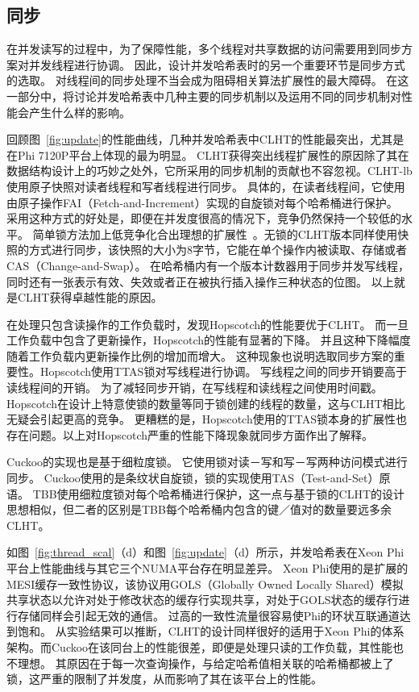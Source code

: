 \subsection{同步}
\label{sec:sync}
在并发读写的过程中，为了保障性能，多个线程对共享数据的访问需要用到同步方案对并发线程进行协调。
因此，设计并发哈希表时的另一个重要环节是同步方式的选取。
对线程间的同步处理不当会成为阻碍相关算法扩展性的最大障碍。
在这一部分中，将讨论并发哈希表中几种主要的同步机制以及运用不同的同步机制对性能会产生什么样的影响。

回顾图~\ref{fig:update}的性能曲线，几种并发哈希表中CLHT的性能最突出，尤其是在Phi 7120P平台上体现的最为明显。
CLHT获得突出线程扩展性的原因除了其在数据结构设计上的巧妙之处外，它所采用的同步机制的贡献也不容忽视。CLHT-lb使用原子快照对读者线程和写者线程进行同步。
具体的，在读者线程间，它使用由原子操作FAI（Fetch-and-Increment）实现的自旋锁对每个哈希桶进行保护。
采用这种方式的好处是，即便在并发度很高的情况下，竞争仍然保持一个较低的水平。
简单锁方法加上低竞争化合出理想的扩展性~\cite{david}。无锁的CLHT版本同样使用快照的方式进行同步，该快照的大小为8字节，它能在单个操作内被读取、存储或者CAS（Change-and-Swap）。
在哈希桶内有一个版本计数器用于同步并发写线程，同时还有一张表示有效、失效或者正在被执行插入操作三种状态的位图。
以上就是CLHT获得卓越性能的原因。

在处理只包含读操作的工作负载时，发现Hopscotch的性能要优于CLHT。
而一旦工作负载中包含了更新操作，Hopscotch的性能有显著的下降。
并且这种下降幅度随着工作负载内更新操作比例的增加而增大。
这种现象也说明选取同步方案的重要性。Hopscotch使用TTAS锁对写线程进行协调。
写线程之间的同步开销要高于读线程间的开销。
为了减轻同步开销，在写线程和读线程之间使用时间戳。
Hopscotch在设计上特意使锁的数量等同于锁创建的线程的数量，这与CLHT相比无疑会引起更高的竞争。
更糟糕的是，Hopscotch使用的TTAS锁本身的扩展性也存在问题。以上对Hopscotch严重的性能下降现象就同步方面作出了解释。

Cuckoo的实现也是基于细粒度锁。
它使用锁对读－写和写－写两种访问模式进行同步。
Cuckoo使用的是条纹状自旋锁，锁的实现使用TAS（Test-and-Set）原语。
TBB使用细粒度锁对每个哈希桶进行保护，这一点与基于锁的CLHT的设计思想相似，但二者的区别是TBB每个哈希桶内包含的键／值对的数量要远多余CLHT。

如图~\ref{fig:thread_scal}（d）和图~\ref{fig:update}（d）所示，并发哈希表在Xeon Phi平台上性能曲线与其它三个NUMA平台存在明显差异。
Xeon Phi使用的是扩展的MESI缓存一致性协议，该协议用GOLS（Globally Owned Locally Shared）模拟共享状态以允许对处于修改状态的缓存行实现共享，对处于GOLS状态的缓存行进行存储同样会引起无效的通信。
过高的一致性流量很容易使Phi的环状互联通道达到饱和。
从实验结果可以推断，CLHT的设计同样很好的适用于Xeon Phi的体系架构。而Cuckoo在该同台上的性能很差，即便是处理只读的工作负载，其性能也不理想。
其原因在于每一次查询操作，与给定哈希值相关联的哈希桶都被上了锁，这严重的限制了并发度，从而影响了其在该平台上的性能。

